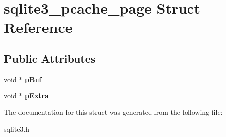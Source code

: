 \hypertarget{structsqlite3__pcache__page}{}\section{sqlite3\+\_\+pcache\+\_\+page Struct Reference}
\label{structsqlite3__pcache__page}
\subsection*{Public Attributes}
\begin{DoxyCompactItemize}
\item 
\mbox{\label{structsqlite3__pcache__page_a19aa6f5638fe2d4eee32aed37a119288}} 
void $\ast$ {\bfseries p\+Buf}
\item 
\mbox{\label{structsqlite3__pcache__page_a6356a15fc426a7558ddf34038f70a65f}} 
void $\ast$ {\bfseries p\+Extra}
\end{DoxyCompactItemize}


The documentation for this struct was generated from the following file\+:\begin{DoxyCompactItemize}
\item 
sqlite3.\+h\end{DoxyCompactItemize}
